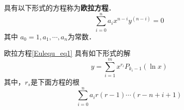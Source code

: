 
\begin{issues}
\issueDraft
\end{issues}

具有以下形式的方程称为\textbf{欧拉方程}．
\begin{equation}\label{Eulequ_eq1}
\sum_{i=0}^{n}a_ix^{n-i}y^{(n-i)}=0
\end{equation}
其中 $a_0=1,a_1,\cdots,a_n$为常数．

欧拉方程\autoref{Eulequ_eq1} 具有如下形式的解
\begin{equation}
y=\sum_{i=1}^mx^{r_i}P_{k_i-1}(\ln x)
\end{equation}
其中，$r_s$是下面方程的根
\begin{equation}
\sum_{i=0}^na_ir(r-1)\cdots(r-n+i+1)
\end{equation}
